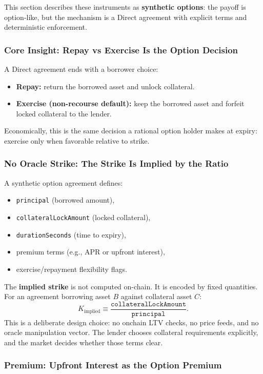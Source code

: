 \documentclass[version=preprint]{iacrcc}
\begin{document}
This section describes these instruments as \textbf{synthetic options}: the payoff is option-like, but the mechanism is a Direct agreement with explicit terms and deterministic enforcement.

\subsubsection{Core Insight: Repay vs Exercise Is the Option Decision}

A Direct agreement ends with a borrower choice:
\begin{itemize}
  \item \textbf{Repay:} return the borrowed asset and unlock collateral.
  \item \textbf{Exercise (non-recourse default):} keep the borrowed asset and forfeit locked collateral to the lender.
\end{itemize}

Economically, this is the same decision a rational option holder makes at expiry: exercise only when favorable relative to strike.

\subsubsection{No Oracle Strike: The Strike Is Implied by the Ratio}

A synthetic option agreement defines:
\begin{itemize}
  \item \texttt{principal} (borrowed amount),
  \item \texttt{collateralLockAmount} (locked collateral),
  \item \texttt{durationSeconds} (time to expiry),
  \item premium terms (e.g., APR or upfront interest),
  \item exercise/repayment flexibility flags.
\end{itemize}

The \textbf{implied strike} is not computed on-chain. It is encoded by fixed quantities. For an agreement borrowing asset $B$ against collateral asset $C$:
\[
K_{\text{implied}} \equiv \frac{\texttt{collateralLockAmount}}{\texttt{principal}}.
\]
This is a deliberate design choice: no onchain LTV checks, no price feeds, and no oracle manipulation vector. The lender chooses collateral requirements explicitly, and the market decides whether those terms clear.

\subsubsection{Premium: Upfront Interest as the Option Premium}
\end{document}
